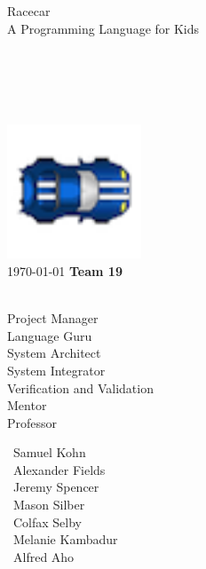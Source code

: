 \begin{titlepage}
\begin{center}

{\Huge Racecar\\
\LARGE A Programming Language for Kids
~\\
~\\
~\\
~\\
~\\
~\\}
\includegraphics[width=0.3\textwidth]{../Racecar/RacecarGUI/images/racecar.png}\\
{\LARGE \today}
\vfill
{\large
\textbf{Team 19}\\~\\}
\begin{minipage}{0.4\textwidth}
\begin{flushleft} \large

Project Manager \\
Language Guru \\
System Architect \\
System Integrator \\
Verification and Validation\\
Mentor\\
Professor\\

\end{flushleft}
\end{minipage}
\begin{minipage}{0.4\textwidth}
\begin{flushright} \large

\ Samuel Kohn\\
\ Alexander Fields\\
\ Jeremy Spencer\\
\ Mason Silber\\
\ Colfax Selby\\
\ Melanie Kambadur\\
\ Alfred Aho\\
\end{flushright}
\end{minipage}

\end{center}
\end{titlepage}
